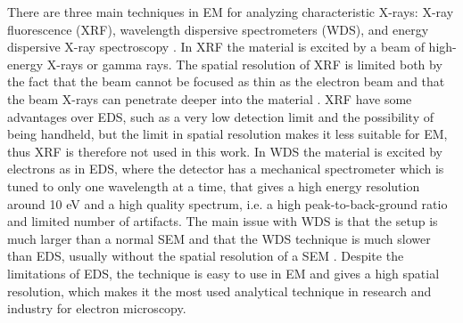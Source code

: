 There are three main techniques in EM for analyzing characteristic X-rays: X-ray fluorescence (XRF), wavelength dispersive spectrometers (WDS), and energy dispersive X-ray spectroscopy \cite{jenkins_xrayspectroscopy}.
In XRF the material is excited by a beam of high-energy X-rays or gamma rays.
The spatial resolution of XRF is limited both by the fact that the beam cannot be focused as thin as the electron beam and that the beam X-rays can penetrate deeper into the material \cite{xrf_spatial_resolution}.
XRF have some advantages over EDS, such as a very low detection limit and the possibility of being handheld, but the limit in spatial resolution makes it less suitable for EM, thus XRF is therefore not used in this work.
In WDS the material is excited by electrons as in EDS, where the detector has a mechanical spectrometer which is tuned to only one wavelength at a time, that gives a high energy resolution around 10 eV and a high quality spectrum, i.e. a high peak-to-back-ground ratio and limited number of artifacts.
The main issue with WDS is that the setup is much larger than a normal SEM and that the WDS technique is much slower than EDS, usually without the spatial resolution of a SEM \cite{goldstein_scanning_2018}.
Despite the limitations of EDS, the technique is easy to use in EM and gives a high spatial resolution, which makes it the most used analytical technique in research and industry for electron microscopy.






